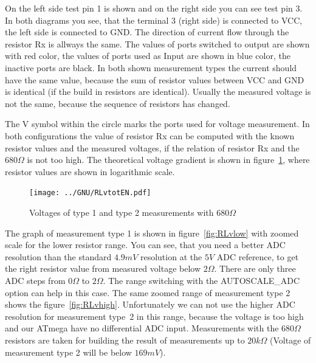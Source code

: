 On the left side test pin 1 is shown and on the right side you can see test pin 3.
In both diagrams you see, that the terminal 3 (right side) is connected to VCC, the left side is
connected to GND. The direction of current flow through the resistor Rx is allways the same. 
The values of ports switched to output are shown with red color, the values of 
ports used as Input are shown in blue color, the inactive ports are black.
In both shown measurement types the current should have the same value, because the sum of resistor values
between VCC and GND is identical (if the build in resistors are identical).
Usually the measured voltage is not the same, because the sequence
of resistors has changed.

The V symbol within the circle marks the ports used for voltage measurement.
In both configurations the value of resistor Rx can be computed with the known
resistor values and the measured voltages, if the relation of resistor Rx and the \(680\Omega\) is not too high.
The theoretical voltage gradient is shown in figure~\ref{fig:RLvtot}, where resistor values are shown in logarithmic scale.
\begin{figure}[H]
\centering
\texttt{[image: ../GNU/RLvtotEN.pdf]}
\caption{Voltages of type 1 and type 2 measurements with \(680\Omega\) }
\label{fig:RLvtot}
\end{figure}
The graph of measurement type 1 is shown in figure~\ref{fig:RLvlow} with zoomed scale for the lower resistor range.
You can see, that you need a better ADC resolution than the standard \(4.9mV\) resolution at the \(5V\) ADC reference, to get
the right resistor value from measured voltage below \(2\Omega\).
There are only three ADC steps from \(0\Omega\) to \(2\Omega\).
The range switching with the AUTOSCALE\_ADC option can help in this case.
The same zoomed range of measurement type 2 shows the figure~\ref{fig:RLvhigh}.
Unfortunately we can not use the higher ADC resolution for measurement type~2 in this range,
 because the voltage is too high and our ATmega have no differential ADC input.
Measurements with the \(680\Omega\) resistors are taken for building the result of measurements up to \(20k\Omega\)
(Voltage of measurement type 2 will be below \(169mV\)).

